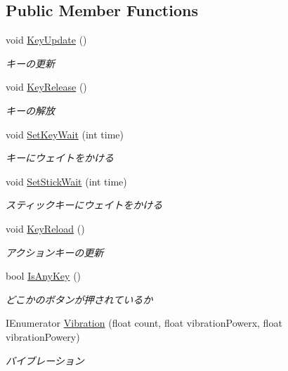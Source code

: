 \subsection*{Public Member Functions}
\begin{DoxyCompactItemize}
\item 
void \hyperlink{class_key_loader_a1a4482487b406f1c9a3a0df3186f223c}{Key\+Update} ()
\begin{DoxyCompactList}\small\item\em キーの更新 \end{DoxyCompactList}\item 
void \hyperlink{class_key_loader_a76cd182f014f01a82281552ececc46fc}{Key\+Release} ()
\begin{DoxyCompactList}\small\item\em キーの解放 \end{DoxyCompactList}\item 
void \hyperlink{class_key_loader_a7907d4061b1bfdf6bf007a5ce6ee24e8}{Set\+Key\+Wait} (int time)
\begin{DoxyCompactList}\small\item\em キーにウェイトをかける \end{DoxyCompactList}\item 
void \hyperlink{class_key_loader_a29ba5c6b4850d69c4d4577eb2e6159ec}{Set\+Stick\+Wait} (int time)
\begin{DoxyCompactList}\small\item\em スティックキーにウェイトをかける \end{DoxyCompactList}\item 
void \hyperlink{class_key_loader_a0d56df66026ce30f307682f82fcadf33}{Key\+Reload} ()
\begin{DoxyCompactList}\small\item\em アクションキーの更新 \end{DoxyCompactList}\item 
bool \hyperlink{class_key_loader_ae74fc217257c432cd43de1712c9b51ec}{Is\+Any\+Key} ()
\begin{DoxyCompactList}\small\item\em どこかのボタンが押されているか \end{DoxyCompactList}\item 
I\+Enumerator \hyperlink{class_key_loader_a61a1d81edb2cddfe02f5710a28db50a1}{Vibration} (float count, float vibration\+Powerx, float vibration\+Powery)
\begin{DoxyCompactList}\small\item\em バイブレーション \end{DoxyCompactList}\end{DoxyCompactItemize}
